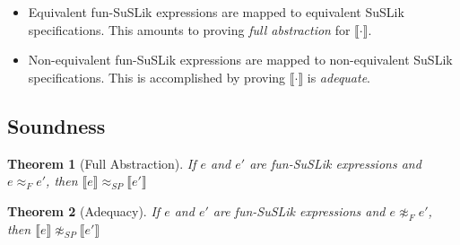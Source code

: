\documentclass[10pt]{article}
\newtheorem{theorem}{Theorem}
\newcommand{\sem} [1] {\llbracket#1\rrbracket}
\begin{document}
\begin{itemize}
  \item Equivalent fun-SuSLik expressions are mapped to equivalent SuSLik specifications. This amounts to proving
    \textit{full abstraction} for $\sem{\cdot}$.
  \item Non-equivalent fun-SuSLik expressions are mapped to non-equivalent SuSLik specifications.
    This is accomplished by proving $\sem{\cdot}$ is \textit{adequate}.
\end{itemize}

\subsection{Soundness}
\label{sec:TransSoundness}

\begin{theorem}[Full Abstraction]
  If $e$ and $e'$ are fun-SuSLik expressions and $e \approx_F e'$, then $\sem{e} \approx_{SP} \sem{e'}$
\end{theorem}

\begin{theorem}[Adequacy]
  If $e$ and $e'$ are fun-SuSLik expressions and $e \not\approx_F e'$, then $\sem{e} \not\approx_{SP} \sem{e'}$
\end{theorem}
\end{document}
